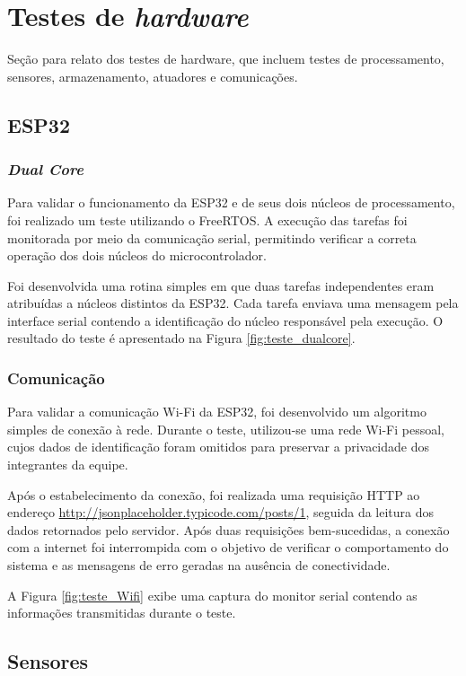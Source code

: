 \section{Testes de \textit{hardware}}

Seção para relato dos testes de hardware, que incluem testes de processamento, sensores, armazenamento, atuadores e comunicações.

\subsection{ESP32}
\subsubsection{\textit{Dual Core}}
Para validar o funcionamento da ESP32 e de seus dois núcleos de processamento, foi realizado um teste utilizando o FreeRTOS. A execução das tarefas foi monitorada por meio da comunicação serial, permitindo verificar a correta operação dos dois núcleos do microcontrolador. 

Foi desenvolvida uma rotina simples em que duas tarefas independentes eram atribuídas a núcleos distintos da ESP32. Cada tarefa enviava uma mensagem pela interface serial contendo a identificação do núcleo responsável pela execução. O resultado do teste é apresentado na Figura \ref{fig:teste_dualcore}. 

\subsubsection{Comunicação}
Para validar a comunicação Wi-Fi da ESP32, foi desenvolvido um algoritmo simples de conexão à rede. Durante o teste, utilizou-se uma rede Wi-Fi pessoal, cujos dados de identificação foram omitidos para preservar a privacidade dos integrantes da equipe.

Após o estabelecimento da conexão, foi realizada uma requisição HTTP ao endereço \href{http://jsonplaceholder.typicode.com/posts/1}{http://jsonplaceholder.typicode.com/posts/1}, seguida da leitura dos dados retornados pelo servidor. Após duas requisições bem-sucedidas, a conexão com a internet foi interrompida com o objetivo de verificar o comportamento do sistema e as mensagens de erro geradas na ausência de conectividade.

A Figura \ref{fig:teste_Wifi} exibe uma captura do monitor serial contendo as informações transmitidas durante o teste.

\subsection{Sensores}
